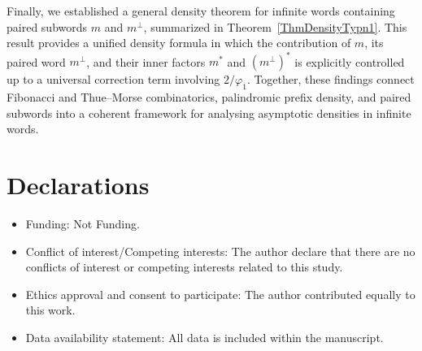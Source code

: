 \documentclass[12pt]{amsart}
\begin{document}
Finally, we established a general density theorem for infinite words containing paired subwords $m$ and $m^{\perp}$, summarized in Theorem~\ref{ThmDensityTypn1}. This result provides a unified density formula in which the contribution of $m$, its paired word $m^{\perp}$, and their inner factors $m^{*}$ and $(m^{\perp})^{*}$ is explicitly controlled up to a universal correction term involving $2/\varphi_1$. Together, these findings connect Fibonacci and Thue--Morse combinatorics, palindromic prefix density, and paired subwords into a coherent framework for analysing asymptotic densities in infinite words.
\section*{Declarations}
\begin{itemize}
	\item Funding: Not Funding.
	\item Conflict of interest/Competing interests: The author declare that there are no conflicts of interest or competing interests related to this study.
	\item Ethics approval and consent to participate: The author contributed equally to this work.
	\item Data availability statement: All data is included within the manuscript.
\end{itemize}
\end{document}
